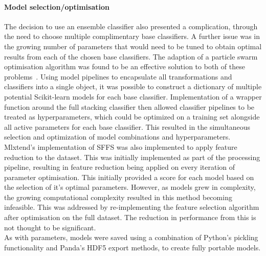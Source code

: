 \documentclass[titlepage, 12pt]{scrartcl} \usepackage{enumitem}
\begin{document}
\paragraph{Model selection/optimisation}\label{ModOp}
The decision to use an ensemble classifier also presented a complication,
through the need to choose multiple complimentary base classifiers. A further
issue was in the growing number of parameters that would need to be tuned to
obtain optimal results from each of the chosen base classifiers. The adaption
of a particle swarm optimisation algorithm was found to be an effective
solution to both of these problems~\parencite{Claesen2014}. Using model
pipelines to encapsulate all transformations and classifiers into a single
object, it was possible to construct a dictionary of multiple potential
Scikit-learn models for each base classifier.  Implementation of a wrapper
function around the full stacking classifier then allowed classifier pipelines
to be treated as hyperparameters, which could be optimized on a training set
alongside all active parameters for each base classifier. This resulted in the
simultaneous selection and optimization of model combinations and
hyperparameters.\\

Mlxtend's implementation of SFFS was also implemented to apply feature reduction to
the dataset. This was initially implemented as part of the processing pipeline,
resulting in feature reduction being applied on every iteration of parameter
optimisation. This initially provided a score for each model based on the
selection of it's optimal parameters. However, as models grew in complexity,
the growing computational complexity resulted in this method becoming infeasible.
This was addressed by re-implementing the feature selection algorithm after
optimisation on the full dataset. The reduction in performance from this is not
thought to be significant.\\

As with parameters, models were saved using a combination of Python's pickling
functionality and Panda's HDF5 export methods, to create fully portable models.
\end{document}
